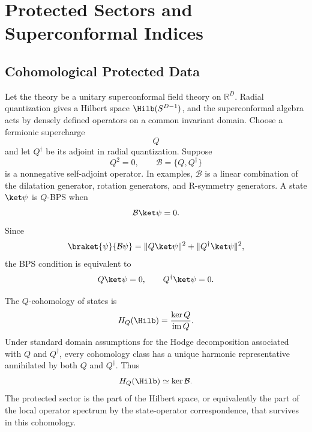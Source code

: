 \chapter{Protected Sectors and Superconformal Indices}
\label{ch:volume-iii-protected-sectors-superconformal-indices}

\section{Cohomological Protected Data}

Let the theory be a unitary superconformal field theory on
\(\mathbb R^D\).  Radial quantization gives a Hilbert space
\(\Hilb(S^{D-1})\), and the superconformal algebra acts by densely defined
operators on a common invariant domain.  Choose a fermionic supercharge
\[
  Q
\]
and let \(Q^\dagger\) be its adjoint in radial quantization.  Suppose
\[
  Q^2=0,
  \qquad
  \mathcal B=\{Q,Q^\dagger\}
  \label{eq:bps-positive-operator}
\]
is a nonnegative self-adjoint operator.  In examples, \(\mathcal B\) is a
linear combination of the dilatation generator, rotation generators, and
R-symmetry generators.  A state \(\ket\psi\) is \(Q\)-BPS when
\[
  \mathcal B\ket\psi=0.
\]
Since
\[
  \braket{\psi}{\mathcal B\psi}
  =
  \|Q\ket\psi\|^2+\|Q^\dagger\ket\psi\|^2,
\]
the BPS condition is equivalent to
\[
  Q\ket\psi=0,
  \qquad
  Q^\dagger\ket\psi=0.
\]

The \(Q\)-cohomology of states is
\begin{equation}
  H_Q(\Hilb)
  =
  \frac{\ker Q}{\operatorname{im} Q}.
  \label{eq:q-cohomology-hilbert-space}
\end{equation}
Under standard domain assumptions for the Hodge decomposition associated with
\(Q\) and \(Q^\dagger\), every cohomology class has a unique harmonic
representative annihilated by both \(Q\) and \(Q^\dagger\).  Thus
\[
  H_Q(\Hilb)\simeq \ker\mathcal B .
\]
The protected sector is the part of the Hilbert space, or equivalently the
part of the local operator spectrum by the state-operator correspondence, that
survives in this cohomology.

